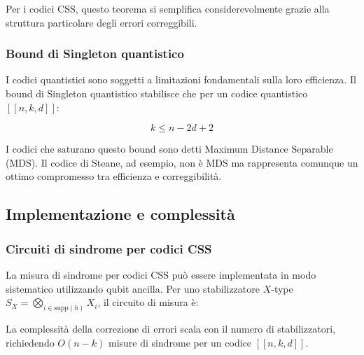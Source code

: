 \documentclass[a4paper,12pt]{report}
\theoremstyle{plain}
\begin{document}
Per i codici CSS, questo teorema si semplifica considerevolmente grazie alla struttura particolare degli errori correggibili.

\subsubsection{Bound di Singleton quantistico}

I codici quantistici sono soggetti a limitazioni fondamentali sulla loro efficienza. Il bound di Singleton quantistico stabilisce che per un codice quantistico $[[n,k,d]]$:

\[
k \leq n - 2d + 2
\]

I codici che saturano questo bound sono detti Maximum Distance Separable (MDS). Il codice di Steane, ad esempio, non è MDS ma rappresenta comunque un ottimo compromesso tra efficienza e correggibilità.
\subsection{Implementazione e complessità}
\subsubsection{Circuiti di sindrome per codici CSS}
La misura di sindrome per codici CSS può essere implementata in modo sistematico utilizzando qubit ancilla. Per uno stabilizzatore $X$-type $S_X = \bigotimes_{i \in \text{supp}(h)} X_i$, il circuito di misura è:
\begin{center}
\end{center}
La complessità della correzione di errori scala con il numero di stabilizzatori, richiedendo $O(n-k)$ misure di sindrome per un codice $[[n,k,d]]$.
\end{document}
